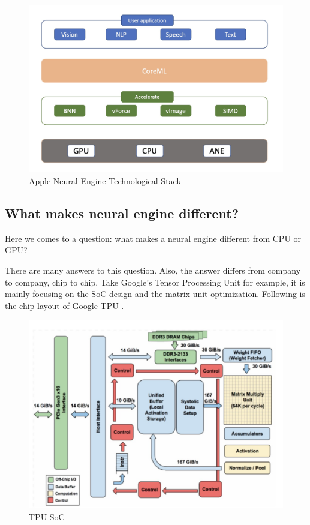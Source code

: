 \documentclass[11pt]{article}
\begin{document}
\begin{figure}[h]
    \centering
    \includegraphics[scale = 0.2]{ane_technology_stack.jpg}
    \caption{Apple Neural Engine Technological Stack}
	\label{fig:Apple Neural Engine Technological Stack}
\end{figure}

\subsection*{What makes neural engine different?}
Here we comes to a question: what makes a neural engine different from CPU or GPU?

There are many answers to this question. Also, the answer differs from company to company, chip to chip. Take Google’s Tensor Processing Unit for example, it is mainly focusing on the SoC design and the matrix unit optimization. Following is the chip layout of Google TPU \cite{tpu}.

\begin{figure}[h]
    \centering
    \includegraphics[scale = 0.3]{tpu_layout.jpg}
    \caption{TPU SoC\cite{tpu}}
	\label{fig:TPU SoC}
\end{figure}
\end{document}
